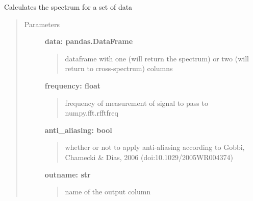 \documentclass[a4paper,10pt,english]{sphinxmanual}
\begin{document}

\begin{fulllineitems}
\label{pymicra:pymicra.data.spectrum}
Calculates the spectrum for a set of data
\begin{quote}\begin{description}
\item[{Parameters}] \leavevmode
\textbf{data: pandas.DataFrame}
\begin{quote}

dataframe with one (will return the spectrum) or two (will return to cross-spectrum) columns
\end{quote}

\textbf{frequency: float}
\begin{quote}

frequency of measurement of signal to pass to numpy.fft.rfftfreq
\end{quote}

\textbf{anti\_aliasing: bool}
\begin{quote}

whether or not to apply anti-aliasing according to Gobbi, Chamecki \& Dias, 2006 (doi:10.1029/2005WR004374)
\end{quote}

\textbf{outname: str}
\begin{quote}

name of the output column
\end{quote}

\end{description}\end{quote}

\end{fulllineitems}

\end{document}
